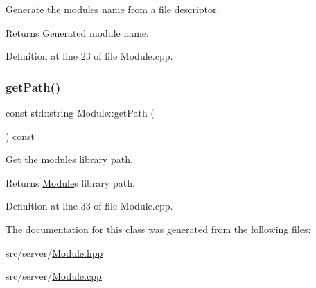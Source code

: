 Generate the module\textquotesingle{}s name from a file descriptor. 

\begin{DoxyReturn}{Returns}
Generated module name. 
\end{DoxyReturn}


Definition at line 23 of file Module.\+cpp.

\mbox{\label{class_zia_1_1_module_ae9e284d2b324100926271ca383704552}} 
\subsubsection{\texorpdfstring{get\+Path()}{getPath()}}
{\footnotesize\ttfamily const std\+::string Module\+::get\+Path (\begin{DoxyParamCaption}{ }\end{DoxyParamCaption}) const\hspace{0.3cm}{\ttfamily [noexcept]}}



Get the module\textquotesingle{}s library path. 

\begin{DoxyReturn}{Returns}
\hyperlink{class_zia_1_1_module}{Module}\textquotesingle{}s library path. 
\end{DoxyReturn}


Definition at line 33 of file Module.\+cpp.



The documentation for this class was generated from the following files\+:\begin{DoxyCompactItemize}
\item 
src/server/\hyperlink{_module_8hpp}{Module.\+hpp}\item 
src/server/\hyperlink{_module_8cpp}{Module.\+cpp}\end{DoxyCompactItemize}
